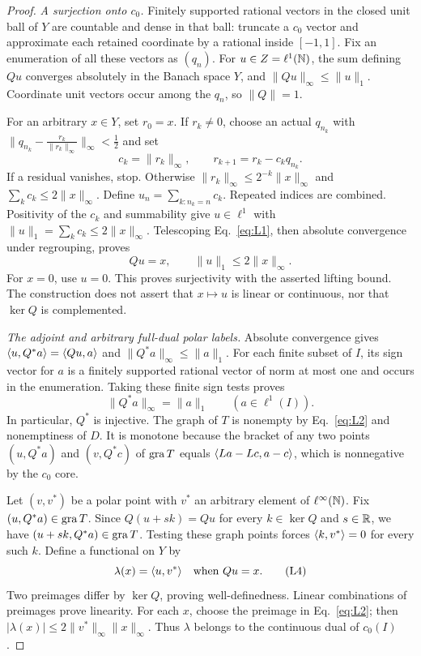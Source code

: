 \begin{proof}
\noindent\textit{A surjection onto $c_0$.}
\label{sec:L1}
Finitely supported rational vectors in the closed unit ball of $Y$ are
countable and dense in that ball: truncate a $c_0$ vector and approximate
each retained coordinate by a rational inside $[-1,1]$. Fix an enumeration
of all these vectors as $(q_n)$. For $u\in Z=\ell^1(\mathbb N)$, the sum defining
$Qu$ converges absolutely in the Banach space $Y$, and
$\|Qu\|_\infty\le\|u\|_1$. Coordinate unit vectors occur among the $q_n$,
so $\|Q\|=1$.

For an arbitrary $x\in Y$, set $r_0=x$. If $r_k\ne0$, choose an actual
$q_{n_k}$ with $\|q_{n_k}-\frac{r_k}{\|r_k\|_\infty}\|_\infty<\frac{1}{2}$ and set
\begin{equation}
c_k=\|r_k\|_\infty,\qquad r_{k+1}=r_k-c_kq_{n_k}.
\tag{L1}\label{eq:L1}
\end{equation}
If a residual vanishes, stop. Otherwise
$\|r_k\|_\infty\le2^{-k}\|x\|_\infty$ and $\sum_k c_k\le2\|x\|_\infty$.
Define $u_n=\sum_{k:n_k=n}c_k$. Repeated indices are combined.
Positivity of the $c_k$ and summability give $u\in\ell^1$ with
$\|u\|_1=\sum_k c_k\le2\|x\|_\infty$.
Telescoping Eq.~\eqref{eq:L1}, then absolute convergence under regrouping,
proves
\begin{equation}
Qu=x,\qquad \|u\|_1\le2\|x\|_\infty.
\tag{L2}\label{eq:L2}
\end{equation}
For $x=0$, use $u=0$. This proves surjectivity with the asserted lifting
bound. The construction does not assert that $x\mapsto u$ is linear or
continuous, nor that $\ker Q$ is complemented.

\noindent\textit{The adjoint and arbitrary full-dual polar labels.}
\label{sec:L2}
Absolute convergence gives $\langle u,Q^*a\rangle=\langle Qu,a\rangle$ and
$\|Q^*a\|_\infty\le\|a\|_1$. For each finite subset of $I$, its sign
vector for $a$ is a finitely supported rational vector of norm at most
one and occurs in the enumeration. Taking these finite sign tests proves
\begin{equation}
\|Q^*a\|_\infty=\|a\|_1\qquad(a\in\ell^1(I)).
\tag{L3}\label{eq:L3}
\end{equation}
In particular, $Q^*$ is injective. The graph of $T$ is nonempty by
Eq.~\eqref{eq:L2} and nonemptiness of $D$. It is monotone because the
bracket of any two points $(u,Q^*a)$ and $(v,Q^*c)$ of $\operatorname{gra} T$ equals
$\langle La-Lc,a-c\rangle$, which is nonnegative by the $c_0$ core.

Let $(v,v^*)$ be a polar point with $v^*$ an arbitrary element of
$\ell^\infty(\mathbb N)$. Fix $(u,Q^*a)\in\operatorname{gra} T$. Since $Q(u+sk)=Qu$ for
every $k\in\ker Q$ and $s\in\mathbb R$, we have $(u+sk,Q^*a)\in\operatorname{gra} T$.
Testing these graph points forces
$\langle k,v^*\rangle=0$ for every such $k$. Define a functional on $Y$ by
\begin{equation}
\lambda(x)=\langle u,v^*\rangle\quad\text{when }Qu=x.
\tag{L4}\label{eq:L4}
\end{equation}
Two preimages differ by $\ker Q$, proving well-definedness. Linear
combinations of preimages prove linearity. For each $x$, choose the
preimage in Eq.~\eqref{eq:L2}; then
$|\lambda(x)|\le2\|v^*\|_\infty\|x\|_\infty$. Thus $\lambda$ belongs to
the continuous dual of $c_0(I)$.


\end{proof}
